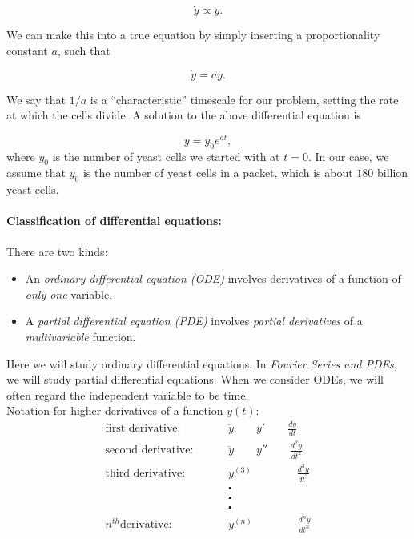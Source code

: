 \documentclass[8pt, a4paper]{article}
\begin{document}
\begin{equation*}
  \dot{y} \propto y.  
\end{equation*}

We can make this into a true equation by simply inserting a proportionality constant $a$, such that

\begin{equation*}
  \dot{y} = ay. 
\end{equation*}

We say that $1/a$ is a ``characteristic'' timescale for our problem, setting the rate at which the cells divide. A solution to the above differential equation is

\begin{equation*}
  y = y_0e^{at},
\end{equation*}
where $y_0$ is the number of yeast cells we started with at $t=0$.
In our case, we assume that $y_0$ is the number of yeast cells in a packet, which is about $180$ billion yeast cells.
\clearpage

\paragraph{Classification of differential equations:}
There are two kinds:
\begin{itemize}
\item An \emph{\color{blue} ordinary differential equation (ODE)}  involves derivatives of a function of \emph{only one} variable.
\item A \emph{\color{blue} partial differential equation (PDE)} involves \emph{partial derivatives} of a \emph{multivariable} function.
\end{itemize}

Here we will study ordinary differential equations. In \textit{Fourier Series and PDEs}, we will study partial differential equations. When we consider ODEs, we will often regard the independent variable to be time.\\

Notation for higher derivatives of a function $y(t)$:
\begin{align*}
  \text{first derivative: } \qquad  &\dot{y}\qquad y'\qquad \frac{dy}{dt}\\
  \text{second derivative: } \qquad  &\ddot{y}\qquad y''\qquad \frac{d^2y}{dt^2}\\
  \text{third derivative: } \qquad  &y^{(3)}\qquad \qquad \frac{d^3y}{dt^3}\\
                                    &\centerdot \\
                                    &\centerdot \\
                                    &\centerdot \\
  n^{th} \text{derivative: } \qquad &y^{(n)}\qquad \qquad \frac{d^ny}{dt^n}                              
\end{align*}
\end{document}
